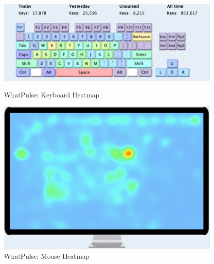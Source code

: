 \documentclass{article}
\begin{document}
\begin{figure}[ht]
	\vskip 0.2in
	\begin{center}
		\centerline{\includegraphics[width=\columnwidth]{keyboard}}
		\label{keyboard}
		\caption{WhatPulse: Keyboard Heatmap}

		\label{icml-historical}
	\end{center}
	\vskip -0.2in
\end{figure} 

\begin{figure}[ht]
	\vskip 0.2in
	\begin{center}
		\centerline{\includegraphics[width=\columnwidth]{mouse_movement}}
		\caption{WhatPulse: Mouse Heatmap
		}
		\label{icml-historical}
	\end{center}
	\vskip -0.2in
\end{figure} 
\end{document}
